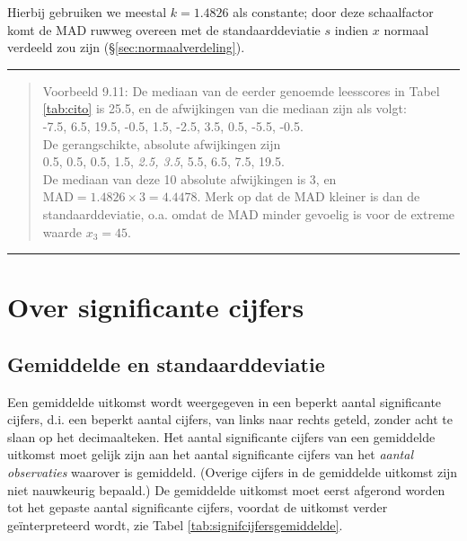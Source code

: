 \documentclass[
]{book}
\begin{document}
Hierbij gebruiken we meestal \(k=1.4826\) als constante; door deze schaalfactor komt de MAD
ruwweg overeen met de standaarddeviatie \(s\) indien \(x\) normaal verdeeld
zou zijn (§\ref{sec:normaalverdeling}).

\begin{center}\rule{0.5\linewidth}{0.5pt}\end{center}

\begin{quote}
Voorbeeld 9.11:
De mediaan van de eerder genoemde leesscores in
Tabel \ref{tab:cito} is
25.5, en de afwijkingen van die mediaan zijn als volgt:\\
-7.5, 6.5, 19.5, -0.5, 1.5, -2.5, 3.5, 0.5, -5.5, -0.5.\\
De gerangschikte, absolute afwijkingen zijn\\
0.5, 0.5, 0.5, 1.5, \emph{2.5, 3.5}, 5.5, 6.5, 7.5, 19.5.\\
De mediaan van deze 10 absolute afwijkingen is 3, en
\(\textrm{MAD} = 1.4826 \times 3 = 4.4478\). Merk op dat de MAD kleiner is
dan de standaarddeviatie, o.a. omdat de MAD minder gevoelig is voor de
extreme waarde \(x_3=45\).
\end{quote}

\begin{center}\rule{0.5\linewidth}{0.5pt}\end{center}

\hypertarget{sec:significantecijfers}{%
\section{Over significante cijfers}\label{sec:significantecijfers}}

\hypertarget{sec:significantecijfers-gemiddelde}{%
\subsection{Gemiddelde en standaarddeviatie}\label{sec:significantecijfers-gemiddelde}}

Een gemiddelde uitkomst wordt weergegeven in een beperkt aantal
significante cijfers, d.i. een beperkt aantal cijfers, van links naar
rechts geteld, zonder acht te slaan op het decimaalteken. Het aantal
significante cijfers van een gemiddelde uitkomst moet gelijk zijn aan
het aantal significante cijfers van het \emph{aantal observaties} waarover is
gemiddeld. (Overige cijfers in de gemiddelde uitkomst zijn niet
nauwkeurig bepaald.) De gemiddelde uitkomst moet eerst afgerond worden
tot het gepaste aantal significante cijfers, voordat de uitkomst verder
geïnterpreteerd wordt, zie
Tabel \ref{tab:signifcijfersgemiddelde}.
\end{document}
